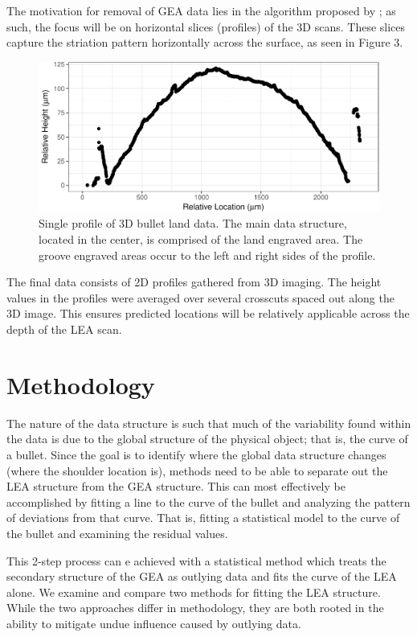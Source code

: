 \documentclass[]{article}
\begin{document}
The motivation for removal of GEA data lies in the algorithm proposed by
\citet{Hare1}; as such, the focus will be on horizontal slices
(profiles) of the 3D scans. These slices capture the striation pattern
horizontally across the surface, as seen in Figure 3.

\begin{figure}
\centering
\includegraphics{writeup_files/figure-latex/unnamed-chunk-2-1.pdf}
\caption{Single profile of 3D bullet land data. The main data structure,
located in the center, is comprised of the land engraved area. The
groove engraved areas occur to the left and right sides of the profile.}
\end{figure}

The final data consists of 2D profiles gathered from 3D imaging. The
height values in the profiles were averaged over several crosscuts
spaced out along the 3D image. This ensures predicted locations will be
relatively applicable across the depth of the LEA scan.

\section{Methodology}

The nature of the data structure is such that much of the variability
found within the data is due to the global structure of the physical
object; that is, the curve of a bullet. Since the goal is to identify
where the global data structure changes (where the shoulder location
is), methods need to be able to separate out the LEA structure from the
GEA structure. This can most effectively be accomplished by fitting a
line to the curve of the bullet and analyzing the pattern of deviations
from that curve. That is, fitting a statistical model to the curve of
the bullet and examining the residual values.

This 2-step process can e achieved with a statistical method which
treats the secondary structure of the GEA as outlying data and fits the
curve of the LEA alone. We examine and compare two methods for fitting
the LEA structure. While the two approaches differ in methodology, they
are both rooted in the ability to mitigate undue influence caused by
outlying data.
\end{document}

